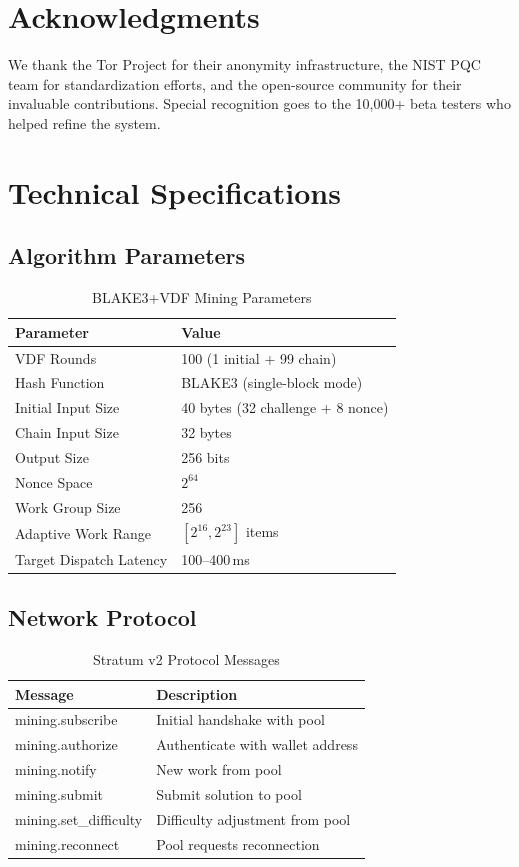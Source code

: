 \documentclass[11pt,a4paper]{article}
\begin{document}
\section*{Acknowledgments}

We thank the Tor Project for their anonymity infrastructure, the NIST PQC team for standardization efforts, and the open-source community for their invaluable contributions. Special recognition goes to the 10,000+ beta testers who helped refine the system.

\appendix

\section{Technical Specifications}

\subsection{Algorithm Parameters}

\begin{table}[H]
\centering
\begin{tabular}{|l|l|}
\hline
\textbf{Parameter} & \textbf{Value} \\
\hline
VDF Rounds & 100 (1 initial + 99 chain) \\
Hash Function & BLAKE3 (single-block mode) \\
Initial Input Size & 40 bytes (32 challenge + 8 nonce) \\
Chain Input Size & 32 bytes \\
Output Size & 256 bits \\
Nonce Space & $2^{64}$ \\
Work Group Size & 256 \\
Adaptive Work Range & $[2^{16}, 2^{23}]$ items \\
Target Dispatch Latency & 100--400\,ms \\
\hline
\end{tabular}
\caption{BLAKE3+VDF Mining Parameters}
\end{table}

\subsection{Network Protocol}

\begin{table}[H]
\centering
\begin{tabular}{|l|p{8cm}|}
\hline
\textbf{Message} & \textbf{Description} \\
\hline
mining.subscribe & Initial handshake with pool \\
mining.authorize & Authenticate with wallet address \\
mining.notify & New work from pool \\
mining.submit & Submit solution to pool \\
mining.set\_difficulty & Difficulty adjustment from pool \\
mining.reconnect & Pool requests reconnection \\
\hline
\end{tabular}
\caption{Stratum v2 Protocol Messages}
\end{table}
\end{document}
